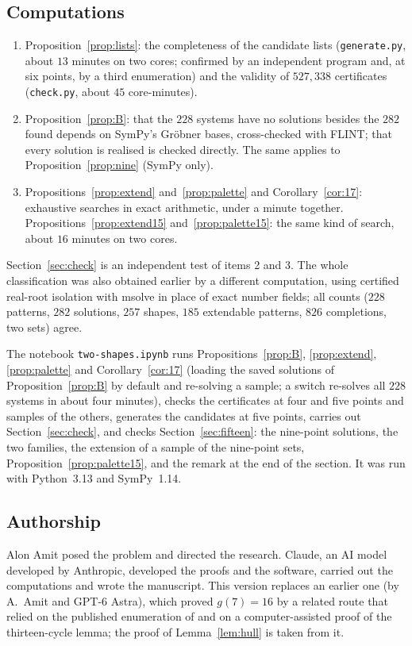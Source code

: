 \documentclass[11pt]{amsart}
\theoremstyle{definition}
\theoremstyle{remark}
\begin{document}
\subsection*{Computations}
\begin{enumerate}
\item Proposition~\ref{prop:lists}: the completeness of the candidate lists (\texttt{generate.py}, about $13$
  minutes on two cores; confirmed by an independent program and, at six points, by a third enumeration)
  and the validity of $527{,}338$ certificates (\texttt{check.py}, about $45$ core-minutes).
\item Proposition~\ref{prop:B}: that the $228$ systems have no solutions besides the $282$ found depends on
  SymPy's Gröbner bases, cross-checked with FLINT; that every solution is realised is checked directly.
  The same applies to Proposition~\ref{prop:nine} (SymPy only).
\item Propositions~\ref{prop:extend} and~\ref{prop:palette} and Corollary~\ref{cor:17}: exhaustive searches
  in exact arithmetic, under a minute together. Propositions~\ref{prop:extend15} and~\ref{prop:palette15}:
  the same kind of search, about $16$ minutes on two cores.
\end{enumerate}
Section~\ref{sec:check} is an independent test of items 2 and 3. The whole classification was also
obtained earlier by a different computation, using certified real-root isolation with msolve in place of
exact number fields; all counts ($228$ patterns, $282$ solutions, $257$ shapes, $185$ extendable patterns,
$826$ completions, two sets) agree.

The notebook \texttt{two-shapes.ipynb} runs Propositions~\ref{prop:B}, \ref{prop:extend}, \ref{prop:palette}
and Corollary~\ref{cor:17} (loading the saved solutions of Proposition~\ref{prop:B} by default and
re-solving a sample; a switch re-solves all $228$ systems in about four minutes), checks the certificates
at four and five points and samples of the others, generates the candidates at five points, carries out
Section~\ref{sec:check}, and checks Section~\ref{sec:fifteen}: the nine-point solutions, the two families, the
extension of a sample of the nine-point sets, Proposition~\ref{prop:palette15}, and the remark at the end of the
section. It was run with Python~3.13 and SymPy~1.14.

\subsection*{Authorship}
Alon Amit posed the problem and directed the research. Claude, an AI model developed by Anthropic, developed
the proofs and the software, carried out the computations and wrote the manuscript. This version replaces an
earlier one (by A.~Amit and GPT-6 Astra), which proved $g(7)=16$ by a related route that relied on the
published enumeration of \cite{SO} and on a computer-assisted proof of the thirteen-cycle lemma; the proof
of Lemma~\ref{lem:hull} is taken from it.
\end{document}
